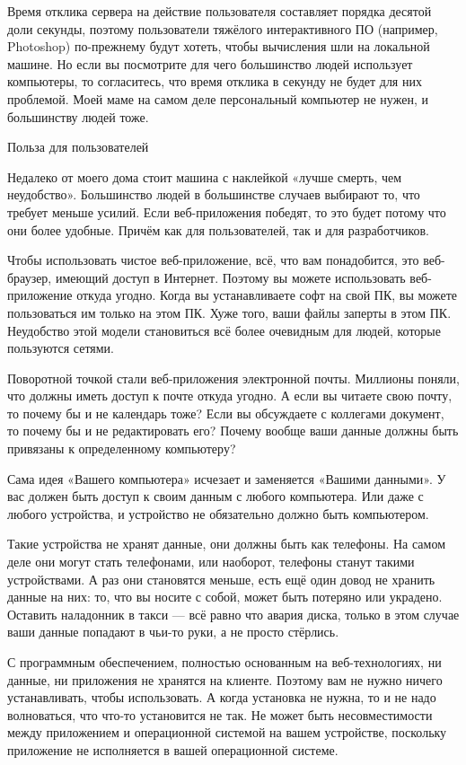 \documentclass[ebook,12pt,oneside,openany]{memoir}
\begin{document}
Время отклика сервера на действие пользователя составляет порядка
десятой доли секунды, поэтому пользователи тяжёлого интерактивного ПО
(например, Photoshop) по-прежнему будут хотеть, чтобы вычисления шли
на локальной машине. Но если вы посмотрите для чего большинство людей
использует компьютеры, то согласитесь, что время отклика в секунду не
будет для них проблемой. Моей маме на самом деле персональный
компьютер не нужен, и большинству людей тоже.

Польза для пользователей

Недалеко от моего дома стоит машина с наклейкой «лучше смерть, чем
неудобство». Большинство людей в большинстве случаев выбирают то, что
требует меньше усилий. Если веб-приложения победят, то это будет
потому что они более удобные. Причём как для пользователей, так и для
разработчиков.

Чтобы использовать чистое веб-приложение, всё, что вам понадобится,
это веб-браузер, имеющий доступ в Интернет. Поэтому вы можете
использовать веб-приложение откуда угодно. Когда вы устанавливаете
софт на свой ПК, вы можете пользоваться им только на этом ПК. Хуже
того, ваши файлы заперты в этом ПК. Неудобство этой модели становиться
всё более очевидным для людей, которые пользуются сетями.

Поворотной точкой стали веб-приложения электронной почты. Миллионы
поняли, что должны иметь доступ к почте откуда угодно. А если вы
читаете свою почту, то почему бы и не календарь тоже? Если вы
обсуждаете с коллегами документ, то почему бы и не редактировать его?
Почему вообще ваши данные должны быть привязаны к определенному
компьютеру?

Сама идея «Вашего компьютера» исчезает и заменяется «Вашими данными».
У вас должен быть доступ к своим данным с любого компьютера. Или даже
с любого устройства, и устройство не обязательно должно быть
компьютером.

Такие устройства не хранят данные, они должны быть как телефоны. На
самом деле они могут стать телефонами, или наоборот, телефоны станут
такими устройствами. А раз они становятся меньше, есть ещё один довод
не хранить данные на них: то, что вы носите с собой, может быть
потеряно или украдено. Оставить наладонник в такси — всё равно что
авария диска, только в этом случае ваши данные попадают в чьи-то руки,
а не просто стёрлись.

С программным обеспечением, полностью основанным на веб-технологиях,
ни данные, ни приложения не хранятся на клиенте. Поэтому вам не нужно
ничего устанавливать, чтобы использовать. А когда установка не нужна,
то и не надо волноваться, что что-то установится не так. Не может быть
несовместимости между приложением и операционной системой на вашем
устройстве, поскольку приложение не исполняется в вашей операционной
системе.
\end{document}
